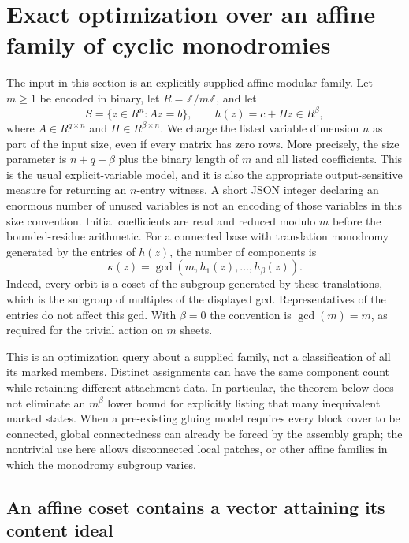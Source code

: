 \section{Exact optimization over an affine family of cyclic monodromies}
\label{sec:affine-cyclic-family}

The input in this section is an explicitly supplied affine modular family.
Let $m\geq 1$ be encoded in binary, let $R=\mathbb Z/m\mathbb Z$, and let
\begin{equation}
 S=\{z\in R^n:Az=b\},\qquad h(z)=c+Hz\in R^\beta,
 \label{eq:affine-seam-family}
\end{equation}
where $A\in R^{q\times n}$ and $H\in R^{\beta\times n}$.
We charge the listed variable dimension $n$ as part of the input size,
even if every matrix has zero rows. More precisely, the size parameter is
$n+q+\beta$ plus the binary length of $m$ and all listed coefficients.
This is the usual explicit-variable model, and it is also the appropriate
output-sensitive measure for returning an $n$-entry witness. A short JSON
integer declaring an enormous number of unused variables is not an
encoding of those variables in this size convention. Initial coefficients
are read and reduced modulo $m$ before the bounded-residue arithmetic.
For a connected base with translation monodromy generated by the entries of
$h(z)$, the number of components is
\begin{equation}
 \kappa(z)=\gcd(m,h_1(z),\ldots,h_\beta(z)).
 \label{eq:affine-component-objective}
\end{equation}
Indeed, every orbit is a coset of the subgroup generated by these translations,
which is the subgroup of multiples of the displayed gcd.  Representatives of
the entries do not affect this gcd.  With $\beta=0$ the convention is
$\gcd(m)=m$, as required for the trivial action on $m$ sheets.

This is an optimization query about a supplied family, not a classification
of all its marked members.  Distinct assignments can have the same component
count while retaining different attachment data.  In particular, the theorem
below does not eliminate an $m^\beta$ lower bound for explicitly listing that
many inequivalent marked states.  When a pre-existing gluing model requires
every block cover to be connected, global connectedness can already be forced
by the assembly graph; the nontrivial use here allows disconnected local
patches, or other affine families in which the monodromy subgroup varies.

\subsection{An affine coset contains a vector attaining its content ideal}

